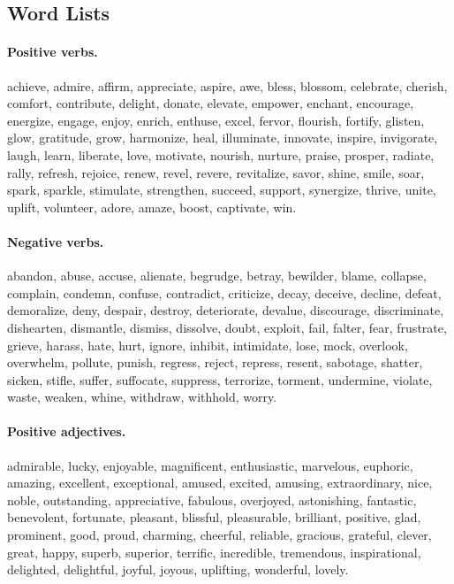 \subsection{Word Lists}

\paragraph{Positive verbs.} achieve, admire, affirm, appreciate, aspire, awe, bless, blossom, celebrate, cherish, comfort, contribute, delight, donate, elevate, empower, enchant, encourage, energize, engage, enjoy, enrich, enthuse, excel, fervor, flourish, fortify, glisten, glow, gratitude, grow, harmonize, heal, illuminate, innovate, inspire, invigorate, laugh, learn, liberate, love, motivate, nourish, nurture, praise, prosper, radiate, rally, refresh, rejoice, renew, revel, revere, revitalize, savor, shine, smile, soar, spark, sparkle, stimulate, strengthen, succeed, support, synergize, thrive, unite, uplift, volunteer, adore, amaze, boost, captivate, win.

\paragraph{Negative verbs.} abandon, abuse, accuse, alienate, begrudge, betray, bewilder, blame, collapse, complain, condemn, confuse, contradict, criticize, decay, deceive, decline, defeat, demoralize, deny, despair, destroy, deteriorate, devalue, discourage, discriminate, dishearten, dismantle, dismiss, dissolve, doubt, exploit, fail, falter, fear, frustrate, grieve, harass, hate, hurt, ignore, inhibit, intimidate, lose, mock, overlook, overwhelm, pollute, punish, regress, reject, repress, resent, sabotage, shatter, sicken, stifle, suffer, suffocate, suppress, terrorize, torment, undermine, violate, waste, weaken, whine, withdraw, withhold, worry.

\paragraph{Positive adjectives.}
admirable, lucky, enjoyable, magnificent, enthusiastic, marvelous, euphoric, amazing, excellent, exceptional, amused, excited, amusing, extraordinary, nice, noble, outstanding, appreciative, fabulous, overjoyed, astonishing, fantastic, benevolent, fortunate, pleasant, blissful, pleasurable, brilliant, positive, glad, prominent, good, proud, charming, cheerful, reliable, gracious, grateful, clever, great, happy, superb, superior, terrific, incredible, tremendous, inspirational, delighted, delightful, joyful, joyous, uplifting, wonderful, lovely.

